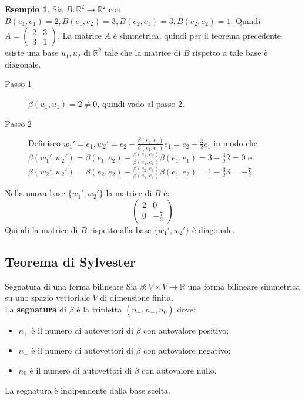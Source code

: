 \documentclass[a4paper]{article}
\theoremstyle{definition}
\newtheorem*{es}{Esempio}
\begin{document}
	\begin{es}
		Sia $B: \mathbb{R}^2 \to \mathbb{R}^2$ con $B(e_1, e_1) = 2, B(e_1, e_2) = 3, B(e_2, e_1) = 3, B(e_2, e_2) = 1$.
		Quindi $A = \begin{pmatrix}
			2 & 3 \\
			3 & 1
		\end{pmatrix}$.
		La matrice $A$ è simmetrica, quindi per il teorema precedente esiste una base $u_1, u_2$ di $\mathbb{R}^2$ tale che la matrice di $B$ rispetto a tale base è diagonale.
		\begin{description}
			\item[Passo 1] $\beta(u_1, u_1) = 2 \ne 0$, quindi vado al passo 2.
			\item[Passo 2] Definisco $w_1' = e_1, w_2' = e_2 - \frac{\beta(e_2, e_1)}{\beta(e_1, e_1)}e_1 = e_2 - \frac{3}{2}e_1$ in modo che $\beta(w_1', w_2') = \beta(e_1, e_2) - \frac{\beta(e_1, e_2)}{\beta(e_1, e_1)}\beta(e_1, e_1) = 3 - \frac{3}{2}2 = 0$
			e $\beta(w_2', w_2') = \beta(e_2, e_2) - \frac{\beta(e_2, e_1)}{\beta(e_1, e_1)}\beta(e_1, e_2) = 1 - \frac{3}{2}3 = -\frac{7}{2}$.
		\end{description}
		Nella nuova base $\{w_1', w_2'\}$ la matrice di $B$ è:
		\begin{equation*}
			\begin{pmatrix}
				2 & 0 \\
				0 & -\frac{7}{2}
			\end{pmatrix}
		\end{equation*}
		Quindi la matrice di $B$ rispetto alla base $\{w_1', w_2'\}$ è diagonale.
	\end{es}

	\subsection{Teorema di Sylvester}
	\begin{deff}{Segnatura di una forma bilineare}{}
		Sia $\beta: V \times V \to \mathbb{R}$ una forma bilineare simmetrica su uno spazio vettoriale $V$ di dimensione finita. \\
		La \textbf{segnatura} di $\beta$ è la tripletta $(n_+, n_-, n_0)$ dove:
		\begin{itemize}
			\item $n_+$ è il numero di autovettori di $\beta$ con autovalore positivo;
			\item $n_-$ è il numero di autovettori di $\beta$ con autovalore negativo;
			\item $n_0$ è il numero di autovettori di $\beta$ con autovalore nullo.
		\end{itemize}
		La segnatura è indipendente dalla base scelta.
	\end{deff}
\end{document}
